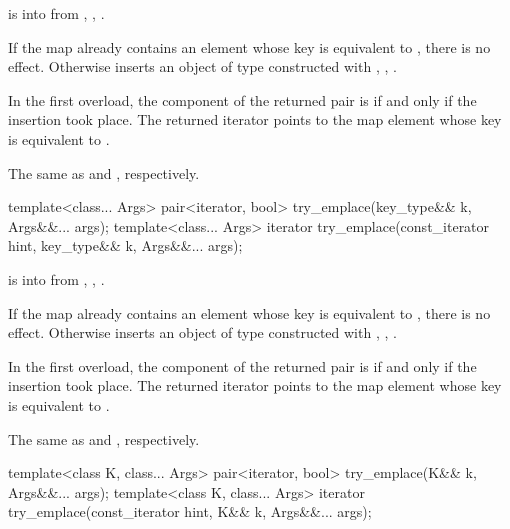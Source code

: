 \begin{itemdescr}
\pnum
\expects
{} is  into 
from , ,
.

\pnum
\effects
If the map already contains an element
whose key is equivalent to ,
there is no effect.
Otherwise inserts an object of type 
constructed with , ,
.

\pnum
\returns
In the first overload,
the  component of the returned pair is 
if and only if the insertion took place.
The returned iterator points to the map element
whose key is equivalent to .

\pnum
\complexity
The same as  and ,
respectively.
\end{itemdescr}

%
\begin{itemdecl}
template<class... Args>
  pair<iterator, bool> try_emplace(key_type&& k, Args&&... args);
template<class... Args>
  iterator try_emplace(const_iterator hint, key_type&& k, Args&&... args);
\end{itemdecl}

\begin{itemdescr}
\pnum
\expects
{} is  into 
from , ,
.

\pnum
\effects
If the map already contains an element
whose key is equivalent to ,
there is no effect.
Otherwise inserts an object of type 
constructed with , ,
.

\pnum
\returns
In the first overload,
the  component of the returned pair is 
if and only if the insertion took place.
The returned iterator points to the map element
whose key is equivalent to .

\pnum
\complexity
The same as  and ,
respectively.
\end{itemdescr}

%
\begin{itemdecl}
template<class K, class... Args>
  pair<iterator, bool> try_emplace(K&& k, Args&&... args);
template<class K, class... Args>
  iterator try_emplace(const_iterator hint, K&& k, Args&&... args);
\end{itemdecl}

